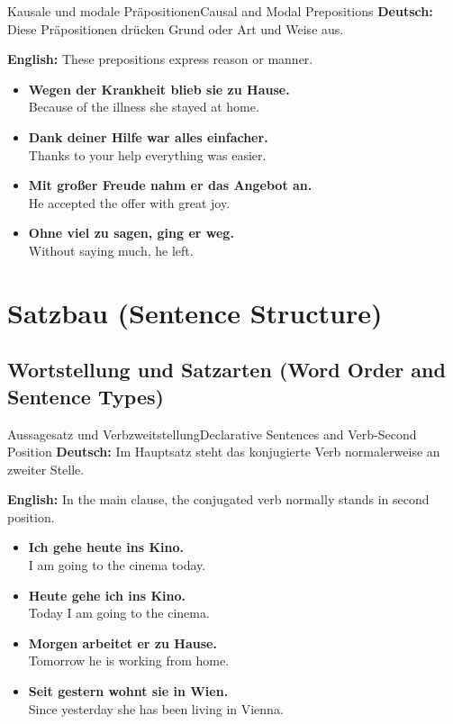 \documentclass[a4paper,11pt]{article}
\newcommand{\GermanText}[1]{\textbf{Deutsch: }#1\par}
\newcommand{\EnglishText}[1]{{\color{SoftGray}\textbf{English: }#1\par}}
\newcommand{\ExampleItem}[2]{\item \textbf{#1}\\{\color{SoftGray}#2}}
\begin{document}
\begin{grammarentry}{Kausale und modale Präpositionen}{Causal and Modal Prepositions}
    \GermanText{Diese Präpositionen drücken Grund oder Art und Weise aus.}
    \EnglishText{These prepositions express reason or manner.}
    \begin{exbox}
        \begin{itemize}
            \ExampleItem{Wegen der Krankheit blieb sie zu Hause.}{Because of the illness she stayed at home.}
            \ExampleItem{Dank deiner Hilfe war alles einfacher.}{Thanks to your help everything was easier.}
            \ExampleItem{Mit großer Freude nahm er das Angebot an.}{He accepted the offer with great joy.}
            \ExampleItem{Ohne viel zu sagen, ging er weg.}{Without saying much, he left.}
        \end{itemize}
    \end{exbox}
\end{grammarentry}

\section{Satzbau {\small (Sentence Structure)}}

\subsection{Wortstellung und Satzarten {\small (Word Order and Sentence Types)}}

\begin{grammarentry}{Aussagesatz und Verbzweitstellung}{Declarative Sentences and Verb-Second Position}
    \GermanText{Im Hauptsatz steht das konjugierte Verb normalerweise an zweiter Stelle.}
    \EnglishText{In the main clause, the conjugated verb normally stands in second position.}
    \begin{exbox}
        \begin{itemize}
            \ExampleItem{Ich gehe heute ins Kino.}{I am going to the cinema today.}
            \ExampleItem{Heute gehe ich ins Kino.}{Today I am going to the cinema.}
            \ExampleItem{Morgen arbeitet er zu Hause.}{Tomorrow he is working from home.}
            \ExampleItem{Seit gestern wohnt sie in Wien.}{Since yesterday she has been living in Vienna.}
        \end{itemize}
    \end{exbox}
\end{grammarentry}
\end{document}
